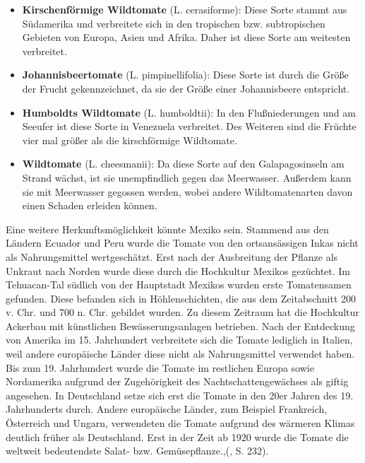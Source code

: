 \begin{itemize}
	\item \textbf{Kirschenförmige Wildtomate} (L. cerasiforme): Diese Sorte stammt aus Südamerika und verbreitete sich in den tropischen bzw. subtropischen Gebieten von Europa, Asien und Afrika. Daher ist diese Sorte am weitesten verbreitet. 
	
	\item \textbf{Johannisbeertomate} (L. pimpinellifolia): Diese Sorte ist durch die Größe der Frucht gekennzeichnet, da sie der Größe einer Johannisbeere entspricht.
	
	\item \textbf{Humboldts Wildtomate} (L. humboldtii): In den Flußniederungen und am Seeufer ist diese Sorte in Venezuela verbreitet. Des Weiteren sind die Früchte vier mal größer als die kirschförmige Wildtomate.
	
	\item \textbf{Wildtomate} (L. cheesmanii): Da diese Sorte auf den Galapagosinseln am Strand wächst, ist sie unempfindlich gegen das Meerwasser. Außerdem kann sie mit Meerwasser gegossen werden, wobei andere Wildtomatenarten davon einen Schaden erleiden können.  
	 
\end{itemize}

Eine weitere Herkunftsmöglichkeit könnte Mexiko sein. Stammend aus den Ländern Ecuador und Peru wurde die Tomate von den ortsansässigen Inkas nicht als Nahrungsmittel wertgeschätzt\cite{nutzpflanzen}. Erst nach der Ausbreitung der Pflanze als Unkraut nach Norden wurde diese durch die Hochkultur Mexikos gezüchtet. Im Tehuacan-Tal südlich von der Hauptstadt Mexikos wurden erste Tomatensamen gefunden. Diese befanden sich in Höhlenschichten, die aus dem Zeitabschnitt 200 v. Chr. und 700 n. Chr. gebildet wurden. Zu diesem Zeitraum hat die Hochkultur Ackerbau mit künstlichen Bewässerungsanlagen betrieben\cite{nutzInDE}. Nach der Entdeckung von Amerika im 15. Jahrhundert\cite{nutzInDE, nutzpflanzen} verbreitete sich die Tomate lediglich in Italien, weil andere europäische Länder diese nicht als Nahrungsmittel verwendet haben. Bis zum 19. Jahrhundert wurde die Tomate im restlichen Europa sowie Nordamerika aufgrund der Zugehörigkeit des Nachtschattengewächses als giftig angesehen. In Deutschland setze sich erst die Tomate in den 20er Jahren des 19. Jahrhunderts durch. Andere europäische Länder, zum Beispiel Frankreich, Österreich und Ungarn, verwendeten die Tomate aufgrund des wärmeren Klimas deutlich früher als Deutschland. Erst in der Zeit ab 1920 wurde die Tomate \glqq[...] die weltweit bedeutendste Salat- bzw. Gemüsepflanze.\grqq,(\cite{nutzpflanzen}, S. 232).


